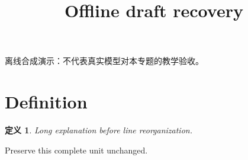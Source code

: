 \documentclass[UTF8,fontset=fandol,11pt]{ctexart}
\title{Offline draft recovery}
\date{}
\newtheorem{definition}{定义}[section]
\begin{document}
\maketitle
\par\noindent 离线合成演示：不代表真实模型对本专题的教学验收。\par
\section{Definition}\label{sec:S01}
\begin{definition}
Long explanation before line reorganization.
\end{definition}
Preserve this complete unit unchanged.\par
\end{document}
